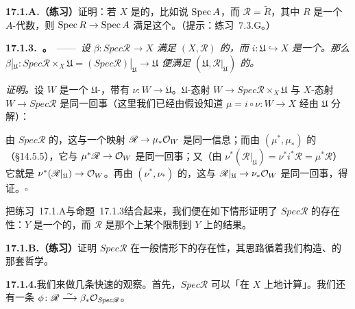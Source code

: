 \textbf{17.1.A.（练习）}\quad 证明：若 $X$ 是\trAffine{}的，比如说 $\operatorname{Spec} A$，而 $\mathscr{R}=\widetilde{R}$，其中 $R$ 是一个 $A$-代数，则 $\operatorname{Spec} R\to\operatorname{Spec} A$ 满足这个\trUniversalProperty。（提示：\mbox{练习~7.3.G}。）

\textbf{17.1.3.\ \trhProposition{}。}\ ——\ \emph{设 $\beta\colon\mathit{Spec}\mathscr{R}\to X$ 满足 $(X,\mathscr{R})$ 的\trUniversalProperty，而 $i\colon\mathfrak{U}\hookrightarrow X$ 是一个\trOpenSubscheme。那么 $\beta|_{\mathfrak{U}}\colon\mathit{Spec}\mathscr{R}\times_X\mathfrak{U}=(\mathit{Spec}\mathscr{R})|_{\mathfrak{U}}\to\mathfrak{U}$ 便满足 $(\mathfrak{U},\mathscr{R}|_{\mathfrak{U}})$ 的\trUniversalProperty。}

\emph{证明。}\quad 设 $W$ 是一个 $\mathfrak{U}$-\trScheme，带有\trStructureMorphism{} $\nu\colon W\to\mathfrak{U}$。$\mathfrak{U}$-态射 $W\to\mathit{Spec}\mathscr{R}\times_X\mathfrak{U}$ 与 $X$-态射 $W\to\mathit{Spec}\mathscr{R}$ 是同一回事（这里我们已经由假设知道 $\mu=i\circ\nu\colon W\to X$ 经由 $\mathfrak{U}$ 分解）：
由 $\mathit{Spec}\mathscr{R}$ 的\trUniversalProperty，这与一个映射 $\mathscr{R}\to\mu_*\mathcal{O}_W$ 是同一信息；而由 $(\mu^*,\mu_*)$ 的\trAdjointness（\S14.5.5），它与 $\mu^*\mathscr{R}\to\mathcal{O}_W$ 是同一回事；又（由 $\nu^*(\mathscr{R}|_{\mathfrak{U}})=\nu^*i^*\mathscr{R}=\mu^*\mathscr{R}$）它就是 $\nu^*(\mathscr{R}|_{\mathfrak{U}})\to\mathcal{O}_W$。再由 $(\nu^*,\nu_*)$ 的\trAdjointness，这与 $\mathscr{R}|_{\mathfrak{U}}\to\nu_*\mathcal{O}_W$ 是同一回事，\trUniversalProperty{}得证。\hfill$\square$

把\mbox{练习~17.1.A}与\mbox{命题~17.1.3}结合起来，我们便在如下情形证明了 $\mathit{Spec}\mathscr{R}$ 的存在性：$Y$ 是一个\trAffineScheme{}的\trOpenSubscheme，而 $\mathscr{R}$ 是那个\trAffineScheme{}上某个\trQC{}\trSheafOfAlgebras{}限制到 $Y$ 上的结果。

\textbf{17.1.B.（练习）}\quad 证明 $\mathit{Spec}\mathscr{R}$ 在一般情形下的存在性，其思路循着我们构造\trFiberProduct、的那套哲学。

\textbf{17.1.4.}\quad 我们来做几条快速的观察。首先，$\mathit{Spec}\mathscr{R}$ 可以「在 $X$ 上\trAffineLocal{}地计算」。我们还有一条\trIsomorphism{} $\phi\colon\mathscr{R}\overset{\sim}{\longrightarrow}\beta_*\mathcal{O}_{\mathit{Spec}\mathscr{R}}$。

